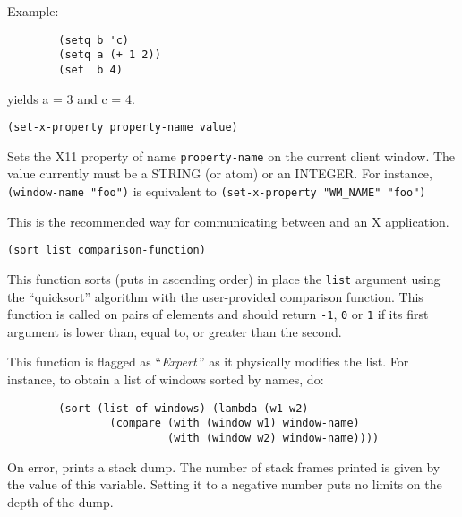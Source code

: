 Example:{\exemplefont\upspace\begin{verbatim}
        (setq b 'c)
        (setq a (+ 1 2))
        (set  b 4)
\end{verbatim}}
yields a = 3 and c = 4.

        
{\usagefont\begin{verbatim}
(set-x-property property-name value)
\end{verbatim}}\usageupspace

Sets the X11 property of name \verb"property-name" on  the current client
window.  The value currently must be a STRING (or atom) or an INTEGER.  For
instance, \verb|(window-name "foo")| is equivalent to 
\verb|(set-x-property "WM_NAME" "foo")|

This is the recommended way for communicating between {\GWM} and an X 
application.


{\usagefont\begin{verbatim}
(sort list comparison-function)
\end{verbatim}}\usageupspace

This function sorts (puts in ascending order)
in place the \verb"list" argument using the ``quicksort''
algorithm with the user-provided comparison function.
This function is called on pairs of elements and should return
\verb"-1", \verb"0" or \verb"1" if its first argument is lower than, equal
to, or greater than the second.

This function is flagged as ``{\em Expert}\,'' as it physically modifies the
list. For instance, to obtain a list of windows sorted by names, do:

{\exemplefont\begin{verbatim}
        (sort (list-of-windows) (lambda (w1 w2)
                (compare (with (window w1) window-name)
                         (with (window w2) window-name))))
\end{verbatim}}



On error, {\WOOL} prints a stack dump. The number of stack frames printed
is given by the value of this variable. Setting it to a negative number 
puts no limits on the depth of the dump.


